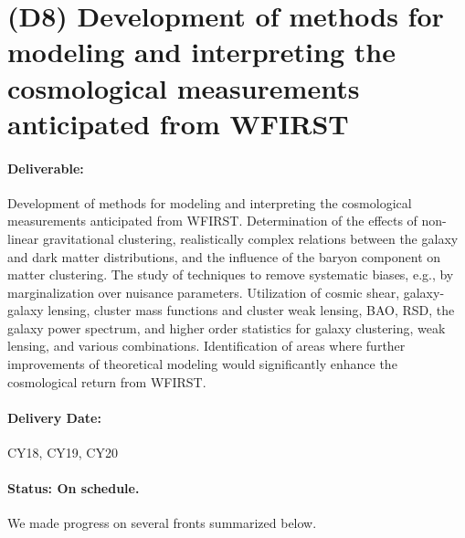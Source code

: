 \section*{(D8) Development of methods for modeling and interpreting the cosmological
measurements anticipated from WFIRST}

\paragraph*{Deliverable:} Development of methods for modeling and interpreting the cosmological measurements anticipated from WFIRST. Determination of the effects of non-linear gravitational clustering, realistically complex relations between the
galaxy and dark matter distributions, and the influence of the baryon
component on matter clustering. The study of techniques to
remove systematic biases, e.g., by marginalization over nuisance
parameters. Utilization of cosmic shear, galaxy-galaxy lensing, cluster mass functions and cluster weak lensing, BAO, RSD, the galaxy
power spectrum, and higher order statistics for galaxy clustering, weak
lensing, and various combinations. Identification of areas where
further improvements of theoretical modeling would significantly
enhance the cosmological return from WFIRST.

\paragraph*{Delivery Date:} CY18, CY19, CY20

\paragraph*{Status: On schedule.} We made progress on several fronts summarized below.

